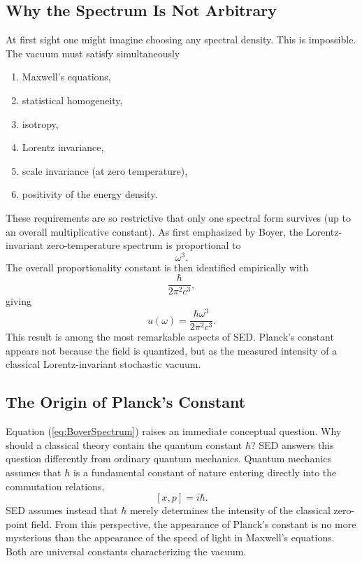 \subsection{Why the Spectrum Is Not Arbitrary}
At first sight one might imagine choosing any spectral density.
This is impossible.
The vacuum must satisfy simultaneously
\begin{enumerate}
\item Maxwell's equations,
\item statistical homogeneity,
\item isotropy,
\item Lorentz invariance,
\item scale invariance (at zero temperature),
\item positivity of the energy density.
\end{enumerate}
These requirements are so restrictive that only one spectral form
survives (up to an overall multiplicative constant).
As first emphasized by Boyer,
the Lorentz-invariant zero-temperature spectrum is proportional to
\[\omega^3.\]
The overall proportionality constant is then identified empirically with
\[\frac{\hbar}{2\pi^2c^3},\]
giving
\begin{equation}
\boxed{u(\omega)=\frac{\hbar\omega^3}{2\pi^2c^3}.}
\label{eq:BoyerSpectrum}
\end{equation}
This result is among the most remarkable aspects of SED.
Planck's constant appears not because the field is quantized, but as the
measured intensity of a classical Lorentz-invariant stochastic vacuum.
\subsection{The Origin of Planck's Constant}
Equation (\ref{eq:BoyerSpectrum}) raises an immediate conceptual
question.
Why should a classical theory contain the quantum constant
$\hbar$?
SED answers this question differently from ordinary quantum mechanics.
Quantum mechanics assumes that $\hbar$ is a fundamental constant of
nature entering directly into the commutation relations,
\[[x,p]=i\hbar.\]
SED assumes instead that $\hbar$ merely determines the intensity of the
classical zero-point field.
From this perspective,
the appearance of Planck's constant is no more mysterious than the
appearance of the speed of light in Maxwell's equations.
Both are universal constants characterizing the vacuum.

